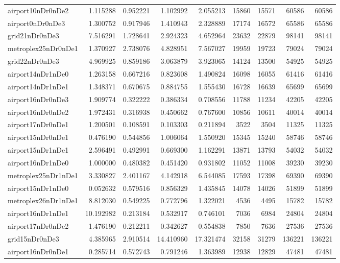 \begin{longtable}{|l|r|r|r|r|r|r|r|r|}
airport10nDr0nDe2 & 1.115288 & 0.952221 & 1.102992 & 2.055213 & 15860 & 15571 & 60586 & 60586 \\
airport0nDr0nDe3 & 1.300752 & 0.917946 & 1.410943 & 2.328889 & 17174 & 16572 & 65586 & 65586 \\
grid21nDr0nDe3 & 7.516291 & 1.728641 & 2.924323 & 4.652964 & 23632 & 22879 & 98141 & 98141 \\
metroplex25nDr0nDe1 & 1.370927 & 2.738076 & 4.828951 & 7.567027 & 19959 & 19723 & 79024 & 79024 \\
grid22nDr0nDe3 & 4.969925 & 0.859186 & 3.063879 & 3.923065 & 14124 & 13500 & 54925 & 54925 \\
airport14nDr1nDe0 & 1.263158 & 0.667216 & 0.823608 & 1.490824 & 16098 & 16055 & 61416 & 61416 \\
airport14nDr1nDe1 & 1.348371 & 0.670675 & 0.884755 & 1.555430 & 16728 & 16639 & 65699 & 65699 \\
airport16nDr0nDe3 & 1.909774 & 0.322222 & 0.386334 & 0.708556 & 11788 & 11234 & 42205 & 42205 \\
airport16nDr0nDe2 & 1.972431 & 0.316938 & 0.450662 & 0.767600 & 10856 & 10611 & 40014 & 40014 \\
airport17nDr0nDe1 & 1.200501 & 0.108591 & 0.103303 & 0.211894 & 3522 & 3504 & 11325 & 11325 \\
airport15nDr0nDe1 & 0.476190 & 0.544856 & 1.006064 & 1.550920 & 15345 & 15240 & 58746 & 58746 \\
airport15nDr1nDe1 & 2.596491 & 0.492991 & 0.669300 & 1.162291 & 13871 & 13793 & 54032 & 54032 \\
airport16nDr1nDe0 & 1.000000 & 0.480382 & 0.451420 & 0.931802 & 11052 & 11008 & 39230 & 39230 \\
metroplex25nDr1nDe1 & 3.330827 & 2.401167 & 4.142918 & 6.544085 & 17593 & 17398 & 69390 & 69390 \\
airport15nDr1nDe0 & 0.052632 & 0.579516 & 0.856329 & 1.435845 & 14078 & 14026 & 51899 & 51899 \\
metroplex26nDr1nDe1 & 8.812030 & 0.549225 & 0.772796 & 1.322021 & 4536 & 4495 & 15782 & 15782 \\
airport16nDr1nDe1 & 10.192982 & 0.213184 & 0.532917 & 0.746101 & 7036 & 6984 & 24804 & 24804 \\
airport17nDr0nDe2 & 1.476190 & 0.212211 & 0.342627 & 0.554838 & 7850 & 7636 & 27536 & 27536 \\
grid15nDr0nDe3 & 4.385965 & 2.910514 & 14.410960 & 17.321474 & 32158 & 31279 & 136221 & 136221 \\
airport16nDr0nDe1 & 0.285714 & 0.572743 & 0.791246 & 1.363989 & 12938 & 12829 & 47481 & 47481 \\

\end{longtable}
